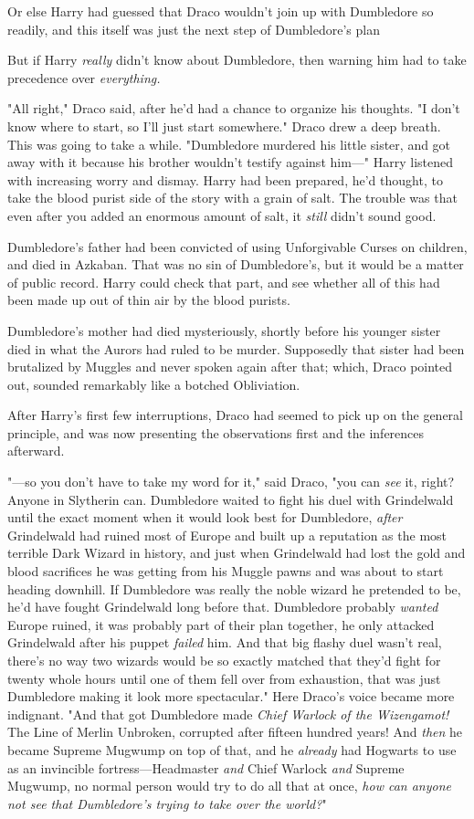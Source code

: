 Or else Harry had guessed that Draco wouldn't join up with Dumbledore so
readily, and this itself was just the next step of Dumbledore's plan{\el}

But if Harry \emph{really} didn't know about Dumbledore, then warning him had
to take precedence over \emph{everything.}

"All right," Draco said, after he'd had a chance to organize his thoughts. "I
don't know where to start, so I'll just start somewhere." Draco drew a deep
breath. This was going to take a while. "Dumbledore murdered his little sister,
and got away with it because his brother wouldn't testify against him\mbox{---}"
\sbreak
Harry listened with increasing worry and dismay. Harry had been prepared, he'd
thought, to take the blood purist side of the story with a grain of salt. The
trouble was that even after you added an enormous amount of salt, it
\emph{still} didn't sound good.

Dumbledore's father had been convicted of using Unforgivable Curses on
children, and died in Azkaban. That was no sin of Dumbledore's, but it would be
a matter of public record. Harry could check that part, and see whether all of
this had been made up out of thin air by the blood purists.

Dumbledore's mother had died mysteriously, shortly before his younger sister
died in what the Aurors had ruled to be murder. Supposedly that sister had been
brutalized by Muggles and never spoken again after that; which, Draco pointed
out, sounded remarkably like a botched Obliviation.

After Harry's first few interruptions, Draco had seemed to pick up on the
general principle, and was now presenting the observations first and the
inferences afterward.

"---so you don't have to take my word for it," said Draco, "you can \emph{see}
it, right? Anyone in Slytherin can. Dumbledore waited to fight his duel with
Grindelwald until the exact moment when it would look best for Dumbledore,
\emph{after} Grindelwald had ruined most of Europe and built up a reputation as
the most terrible Dark Wizard in history, and just when Grindelwald had lost
the gold and blood sacrifices he was getting from his Muggle pawns and was
about to start heading downhill. If Dumbledore was really the noble wizard he
pretended to be, he'd have fought Grindelwald long before that. Dumbledore
probably \emph{wanted} Europe ruined, it was probably part of their plan
together, he only attacked Grindelwald after his puppet \emph{failed} him. And
that big flashy duel wasn't real, there's no way two wizards would be so
exactly matched that they'd fight for twenty whole hours until one of them fell
over from exhaustion, that was just Dumbledore making it look more
spectacular." Here Draco's voice became more indignant. "And that got
Dumbledore made \emph{Chief Warlock of the Wizengamot!} The Line of Merlin
Unbroken, corrupted after fifteen hundred years! And \emph{then} he became
Supreme Mugwump on top of that, and he \emph{already} had Hogwarts to use as an
invincible fortress---Headmaster \emph{and} Chief Warlock \emph{and} Supreme
Mugwump, no normal person would try to do all that at once, \emph{how can
anyone not see that Dumbledore's trying to take over the world?}"

